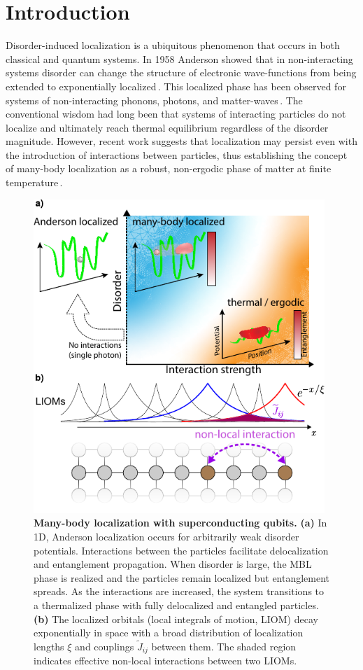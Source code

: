 \section{Introduction} %
Disorder-induced localization is a ubiquitous phenomenon that occurs in both classical and quantum systems. In 1958 Anderson showed that in non-interacting systems disorder can change the structure of electronic wave-functions from being extended to exponentially localized\,\cite{Anderson1958}. This localized phase has been observed for systems of non-interacting phonons, photons, and matter-waves\,\cite{The50years,Billy2008, Weaver1990, Wiersma1997, Schwartz2007}.  The conventional wisdom had long been that systems of interacting particles do not localize and ultimately reach thermal equilibrium regardless of the disorder magnitude. However, recent work suggests that localization may persist even with the introduction of interactions between particles, thus establishing the concept of many-body localization as a robust, non-ergodic phase of matter at finite temperature\,\cite{Basko2006, Gornyi2005, ImbriePRL2016}.

\begin{figure}[h!] %
\centering
\includegraphics[width=110mm]{./PDF/fig_1.pdf}
\caption{ \textbf{Many-body localization with superconducting qubits.} \textbf{(a)} In 1D, Anderson localization occurs for arbitrarily weak disorder potentials. Interactions between the particles facilitate delocalization and entanglement propagation. When disorder is large, the MBL phase is realized and the particles remain localized but entanglement spreads. As the interactions are increased, the system transitions to a thermalized phase with fully delocalized and entangled particles. \textbf{(b)} The localized orbitals (local integrals of motion, LIOM) decay exponentially in space with a broad distribution of localization lengths $\xi$ and couplings $\widetilde{J}_{ij}$ between them. The shaded region indicates effective non-local interactions between two LIOMs.}
\label{ch5:schematic}
\end{figure}


